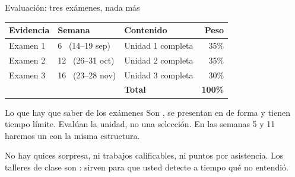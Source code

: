 \documentclass[aspectratio=169,10pt]{beamer}
\begin{document}
\begin{frame}{Evaluación: tres exámenes, nada más}
  \scriptsize
  \begin{center}
  \begin{tabular}{@{}lllr@{}}
    \toprule
    \textbf{Evidencia} & \textbf{Semana} & \textbf{Contenido} &
    \textbf{Peso} \\
    \midrule
    Examen 1 & 6 \ (14--19 sep) & Unidad 1 completa & 35\% \\
    Examen 2 & 12 \ (26--31 oct) & Unidad 2 completa & 35\% \\
    Examen 3 & 16 \ (23--28 nov) & Unidad 3 completa & 30\% \\
    \midrule
    & & \textbf{Total} & \textbf{100\%} \\
    \bottomrule
  \end{tabular}
  \end{center}

  \vspace{0.12cm}
  \begin{block}{Lo que hay que saber de los exámenes}
    \tiny
    Son , se presentan en 
    de forma  y tienen tiempo límite. Evalúan
     la unidad, no una selección. En las semanas 5 y 11 haremos
    un  con la misma estructura.
  \end{block}

  \vspace{0.08cm}
  {\tiny\color{uniGris} No hay quices sorpresa, ni trabajos calificables, ni
  puntos por asistencia. Los talleres de clase son : sirven
  para que usted detecte a tiempo qué no entendió.}
\end{frame}
\end{document}
